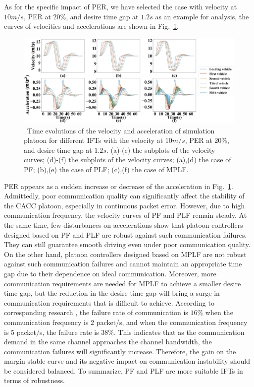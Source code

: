 \documentclass[journal]{IEEEtran}
\begin{document}
As for the specific impact of PER, we have selected the case with velocity at $10 m/s$, PER at 20\%, and desire time gap at $1.2 s$ as an example for analysis, the curves of velocities and accelerations are shown in Fig.~\ref{Figure7}.


\begin{figure}
  \includegraphics[width=18cm]{fig_5.3.4.png}
  \caption{~Time evolutions of the velocity and acceleration of simulation platoon for different IFTs with the velocity at $10 m/s$, PER at 20\%, and desire time gap at $1.2 s$. (a)-(c) the subplots of the velocity curves; (d)-(f) the subplots of the velocity curves; (a),(d) the case of PF; (b),(e) the case of PLF; (c),(f) the case of MPLF.}
  \label{Figure7}
\end{figure}

PER appears as a sudden increase or decrease of the acceleration in Fig.~\ref{Figure7}. Admittedly, poor communication quality can significantly affect the stability of the CACC platoon, especially in continuous packet error. However, due to high communication frequency, the velocity curves of PF and PLF remain steady. At the same time, few disturbances on accelerations show that platoon controllers designed based on PF and PLF are robust against such communication failures. They can still guarantee smooth driving even under poor communication quality. On the other hand, platoon controllers designed based on MPLF are not robust against such communication failures and cannot maintain an appropriate time gap due to their dependence on ideal communication. Moreover, more communication requirements are needed for MPLF to achieve a smaller desire time gap, but the reduction in the desire time gap will bring a surge in communication requirements that is difficult to achieve. According to corresponding research \citep{hafeez2013performance}, the failure rate of communication is $16\%$ when the communication frequency is 2 packet/s, and when the communication frequency is 5 packet/s, the failure rate is $38\%$. This indicates that as the communication demand in the same channel approaches the channel bandwidth, the communication failures will significantly increase. Therefore, the gain on the margin stable curve and its negative impact on communication instability should be considered balanced.
To summarize, PF and PLF are more suitable IFTs in terms of robustness.
\end{document}
